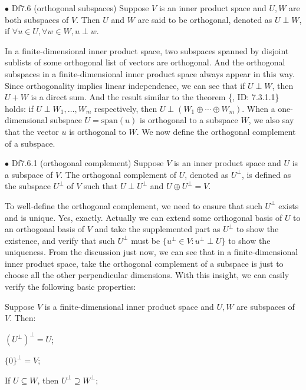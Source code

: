 \documentclass{article}
\begin{document}
\begin{Df}{$\bullet$ Df7.6 (orthogonal subspaces)}
    Suppose $V$ is an inner product space and $U, W$ are both subspaces of $V$. Then $U$ and $W$ are said to be orthogonal, denoted as $U\perp W$, if $\forall u\in U, \forall w\in W, u\perp w$.
\end{Df}

\begin{Rmk}{}
    \textcolor{Th}{In a finite-dimensional inner product space, two subspaces spanned by disjoint sublists of some orthogonal list of vectors are orthogonal. And the orthogonal subspaces in a finite-dimensional inner product space always appear in this way.} Since orthogonality implies linear independence, we can see that \textcolor{Th}{if $U\perp W$, then $U+W$ is a direct sum.} And the result similar to the theorem \{, ID: 7.3.1.1\} holds: \textcolor{Th}{if $U \perp W_1, \dots, W_m$ respectively, then $U\perp (W_1\oplus\cdots\oplus W_m)$.} \textcolor{Df}{When a one-dimensional subspace $U = \text{span}(u)$ is orthogonal to a subspace $W$, we also say that the vector $u$ is orthogonal to $W$.} We now define the orthogonal complement of a subspace.
\end{Rmk}

\begin{Df}{$\bullet$ Df7.6.1 (orthogonal complement)}
    Suppose $V$ is an inner product space and $U$ is a subspace of $V$. The orthogonal complement of $U$, denoted as $U^\perp$, is defined as the subspace $U^\perp$ of $V$ such that $U\perp U^\perp$ and $U\oplus U^\perp = V$.
\end{Df}

\begin{Rmk}{}
    To well-define the orthogonal complement, we need to ensure that such $U^\perp$ exists and is unique. \textcolor{Th}{Yes, exactly. Actually we can extend some orthogonal basis of $U$ to an orthogonal basis of $V$ and take the supplemented part as $U^\perp$ to show the existence, and verify that such $U^\perp$ must be $\{u^\perp\in V: u^\perp\perp U\}$ to show the uniqueness.} From the discussion just now, we can see that \textcolor{Th}{in a finite-dimensional inner product space, take the orthogonal complement of a subspace is just to choose all the other perpendicular dimensions.} With this insight, we can easily verify the following basic properties:
    \textcolor{Th}{Suppose $V$ is a finite-dimensional inner product space and $U, W$ are subspaces of $V$. Then:
        \begin{compactenum}
            \item $(U^\perp)^{\perp} = U$;
            \item $\{0\}^\perp = V$;
            \item If $U\subseteq W$, then $U^\perp\supseteq W^\perp$;
        \end{compactenum}
    }
\end{Rmk}
\end{document}
